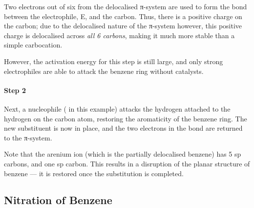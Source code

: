 			Two electrons out of six from the delocalised π-system are used to form the bond between the electrophile, E, and the carbon.
			Thus, there is a positive charge on the carbon; due to the delocalised nature of the π-system however, this positive charge is
			delocalised across \textit{all 6 carbons}, making it much more stable than a simple carbocation.

			However, the activation energy for this step is still large, and only strong electrophiles are able to attack the benzene ring without catalysts.


			\pagebreak
			\paragraph{Step 2}

			Next, a nucleophile ( in this example) attacks the hydrogen attached to the hydrogen on the carbon atom,
			restoring the aromaticity of the benzene ring. The new substituent is now in place, and the two electrons in the 
			bond are returned to the π-system.




			Note that the arenium ion (which is the partially delocalised benzene) has 5 sp carbons, and one sp carbon. This
			results in a disruption of the planar structure of benzene –– it is restored once the substitution is completed.


		\subsection{Nitration of Benzene}

